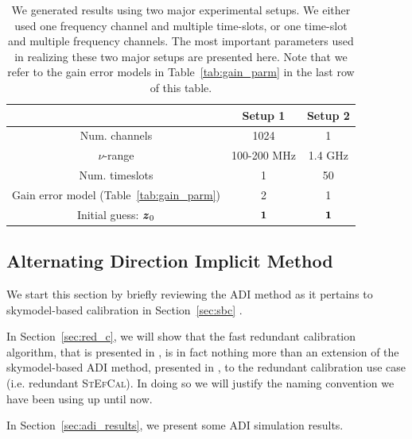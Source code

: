 \documentclass[useAMS,usenatbib]{mn2e}
\newcommand{\bz}{\bmath{z}}
\newcommand{\bone}{\bmath{1}}
\begin{document}
\begin{table}
\centering
\caption{We generated results using two major experimental setups. We either used one frequency channel and multiple time-slots, or one time-slot and multiple frequency 
channels. The most important parameters used in realizing these two major setups are presented here. Note that we refer to the gain error models in Table~\ref{tab:gain_parm} in the 
last row of this table.}
\begin{tabular}{|c c c|} 
\hline
 & Setup 1 & Setup 2\\
\hline
\hline
 Num. channels & 1024 & 1\\
$\nu$-range & 100-200 MHz & 1.4 GHz\\
Num. timeslots & 1 & 50\\
Gain error model (Table~\ref{tab:gain_parm}) & 2 & 1\\
Initial guess: $\bz_0$ & $\bone$ & $\bone$\\
\hline
\end{tabular}
\label{tab:ch_parm}
\end{table}

\subsection{Alternating Direction Implicit Method}
\label{sec:adi}
We start this section by briefly reviewing the ADI method as it pertains to skymodel-based calibration in Section~\ref{sec:sbc} \citep{Salvini2014,Smirnov2015}.

In Section~\ref{sec:red_c}, we will show that the fast redundant calibration algorithm, that is presented in \citet{Marthi2014},
is in fact nothing more than an extension of the skymodel-based ADI method, presented in \citet{Salvini2014}, to the redundant calibration use case (i.e. redundant \textsc{StEfCal}).
In doing so we will justify the naming convention we have been using up until now.

In Section~\ref{sec:adi_results}, we present some ADI simulation results. 
\end{document}
